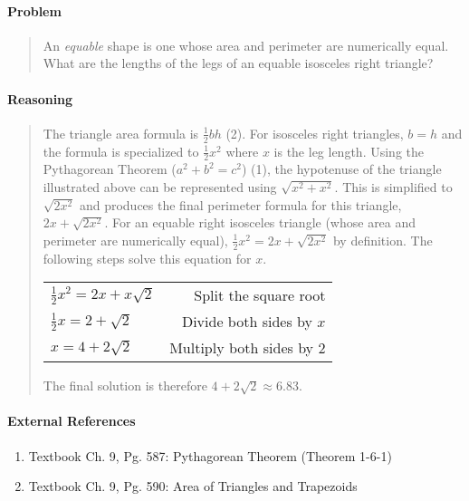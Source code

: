 \documentclass[letterpaper,12pt,twoside]{report}
\begin{document}
	\pagestyle{fancy}
	\fancyhf{}
	
	\paragraph{Problem}
	\begin{quote}
	\textsf{An \textit{equable} shape is one whose area and perimeter are numerically equal. What are the lengths of the legs of an equable isosceles right triangle?}
	\end{quote}
	
	\begin{center}
	\end{center}
	
	\paragraph{Reasoning}
	\begin{quotation}
	
	The triangle area formula is $\frac{1}{2}bh$ (2). For isosceles right triangles, $b=h$ and the formula is specialized to $\frac{1}{2}x^2$ where $x$ is the leg length. Using the Pythagorean Theorem ($a^2+b^2=c^2$) (1), the hypotenuse of the triangle illustrated above can be represented using $\sqrt{x^2+x^2}$. This is simplified to $\sqrt{2x^2}$ and produces the final perimeter formula for this triangle, $2x+\sqrt{2x^2}$. For an equable right isosceles triangle (whose area and perimeter are numerically equal), $\frac{1}{2}x^2 = 2x+\sqrt{2x^2}$ by definition. The following steps solve this equation for $x$.
	
	\begin{center}
		\begin{tabular}{l | r}
			$\frac{1}{2}x^2 = 2x+x\sqrt{2}$ & Split the square root \\
			$\frac{1}{2}x = 2+\sqrt{2}$ & Divide both sides by $x$ \\
			$x = 4+2\sqrt{2}$ & Multiply both sides by 2
		\end{tabular}
	\end{center}

	The final solution is therefore $\boxed{4+2\sqrt{2} \approx 6.83}$.
	
	\end{quotation}
	
	\paragraph{External References}
	
	\begin{enumerate}
		\item Textbook Ch. 9, Pg. 587: Pythagorean Theorem (Theorem 1-6-1)
		\item Textbook Ch. 9, Pg. 590: Area of Triangles and Trapezoids
	\end{enumerate}
\end{document}
